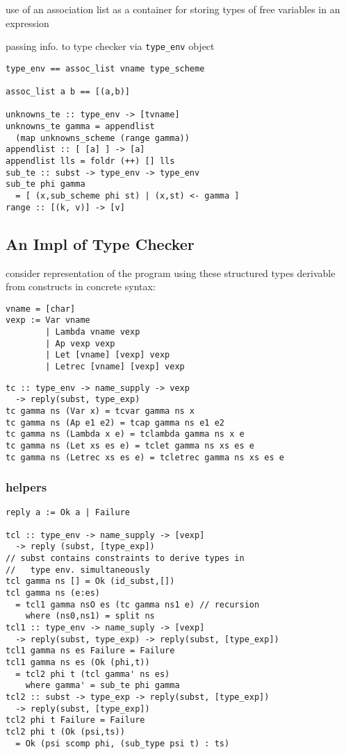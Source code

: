 \documentclass[8pt]{extarticle}
\begin{document}
\begin{multicols*}{2}
use of an association list as a container for storing types of free variables in an expression

passing info. to type checker via \verb|type_env| object

\begin{verbatim}
type_env == assoc_list vname type_scheme

assoc_list a b == [(a,b)]

unknowns_te :: type_env -> [tvname]
unknowns_te gamma = appendlist
  (map unknowns_scheme (range gamma))
appendlist :: [ [a] ] -> [a]
appendlist lls = foldr (++) [] lls
sub_te :: subst -> type_env -> type_env
sub_te phi gamma
  = [ (x,sub_scheme phi st) | (x,st) <- gamma ]
range :: [(k, v)] -> [v]
\end{verbatim}

\vfill\null
\pagebreak

\subsection{An Impl of Type Checker}

consider representation of the program using these structured types derivable from constructs in concrete syntax:
\begin{verbatim}
vname = [char]
vexp := Var vname
        | Lambda vname vexp
        | Ap vexp vexp
        | Let [vname] [vexp] vexp
        | Letrec [vname] [vexp] vexp
\end{verbatim}

\begin{verbatim}
tc :: type_env -> name_supply -> vexp
  -> reply(subst, type_exp)
tc gamma ns (Var x) = tcvar gamma ns x
tc gamma ns (Ap e1 e2) = tcap gamma ns e1 e2
tc gamma ns (Lambda x e) = tclambda gamma ns x e
tc gamma ns (Let xs es e) = tclet gamma ns xs es e
tc gamma ns (Letrec xs es e) = tcletrec gamma ns xs es e
\end{verbatim}

\subsubsection{helpers}
\begin{verbatim}
reply a := Ok a | Failure

tcl :: type_env -> name_supply -> [vexp]
  -> reply (subst, [type_exp])
// subst contains constraints to derive types in
//   type env. simultaneously
tcl gamma ns [] = Ok (id_subst,[])
tcl gamma ns (e:es)
  = tcl1 gamma nsO es (tc gamma ns1 e) // recursion
    where (ns0,ns1) = split ns
tcl1 :: type_env -> name_suply -> [vexp]
  -> reply(subst, type_exp) -> reply(subst, [type_exp])
tcl1 gamma ns es Failure = Failure
tcl1 gamma ns es (Ok (phi,t))
  = tcl2 phi t (tcl gamma' ns es)
    where gamma' = sub_te phi gamma
tcl2 :: subst -> type_exp -> reply(subst, [type_exp])
  -> reply(subst, [type_exp])
tcl2 phi t Failure = Failure
tcl2 phi t (Ok (psi,ts))
  = Ok (psi scomp phi, (sub_type psi t) : ts)


\end{verbatim}
\end{multicols*}
\end{document}
